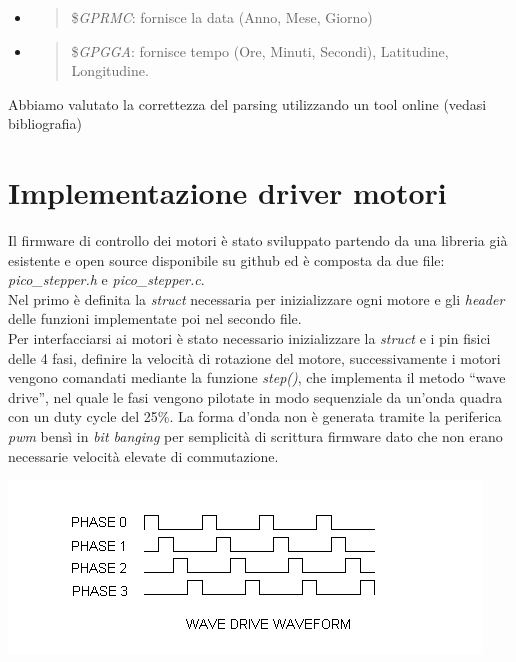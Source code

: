 \begin{itemize}
\item
  \begin{quote}
  \$\emph{GPRMC}: fornisce la data (Anno, Mese, Giorno)
  \end{quote}
\item
  \begin{quote}
  \$\emph{GPGGA}: fornisce tempo (Ore, Minuti, Secondi), Latitudine,
  Longitudine.
  \end{quote}
\end{itemize}

\noindent Abbiamo valutato la correttezza del parsing utilizzando un tool online
(vedasi bibliografia)

\hypertarget{implementazione-driver-motori}{%
\section{Implementazione driver
motori}\label{implementazione-driver-motori}}

\noindent Il firmware di controllo dei motori è stato sviluppato partendo da una
libreria già esistente e open source disponibile su github ed è composta
da due file: \emph{pico\_stepper.h} e \emph{pico\_stepper.c}.\\
Nel primo è definita la \emph{struct} necessaria per inizializzare ogni
motore e gli \emph{header} delle funzioni implementate poi nel secondo
file.\\
Per interfacciarsi ai motori è stato necessario inizializzare la
\emph{struct} e i pin fisici delle 4 fasi, definire la velocità di
rotazione del motore, successivamente i motori vengono comandati
mediante la funzione \emph{step()}, che implementa il metodo ``wave
drive'', nel quale le fasi vengono pilotate in modo sequenziale da
un'onda quadra con un duty cycle del 25\%. La forma d'onda non è
generata tramite la periferica \emph{pwm} bensì in \emph{bit banging}
per semplicità di scrittura firmware dato che non erano necessarie
velocità elevate di commutazione.

\begin{center}
\includegraphics[scale=0.8]{figures/image50.png}
\end{center}

